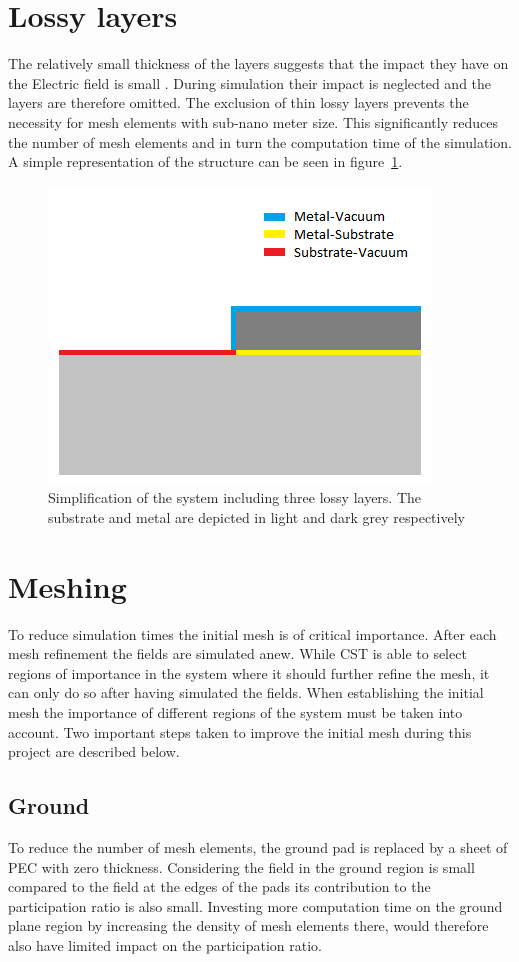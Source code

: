\section{Lossy layers}
The relatively small thickness of the layers suggests that the impact they have on the Electric field is small . During simulation their impact is neglected and the layers are therefore omitted. The exclusion of thin lossy layers prevents the necessity for mesh elements with sub-nano meter size. This significantly reduces the number of mesh elements and in turn the computation time of the simulation. A simple representation of the structure can be seen in figure~\ref{fig:model}.
\begin{figure}
\includegraphics[scale=.8]{Figures/model}
\caption{Simplification of the system including three lossy layers. The substrate and metal are depicted in light and dark grey respectively}
\label{fig:model}
\end{figure}

\section{Meshing}
To reduce simulation times the initial mesh is of critical importance. After each mesh refinement the fields are simulated anew. While CST is able to select regions of importance in the system where it should further refine the mesh, it can only do so after having simulated the fields. When establishing the initial mesh the importance of different regions of the system must be taken into account. Two  important steps taken to improve the initial mesh during this project are described below.   


\subsection{Ground}
To reduce the number of mesh elements, the ground pad is replaced by a sheet of PEC with zero thickness. Considering the field in the ground region is small compared to the field at the edges of the pads its contribution to the participation ratio is also small. Investing more computation time on the ground plane region by increasing the density of mesh elements there, would therefore also have limited impact on the participation ratio.
